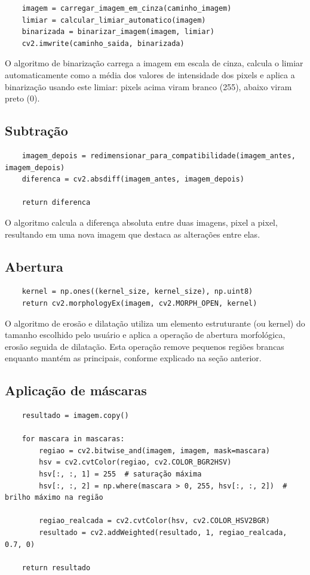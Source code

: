 \documentclass{article}
\begin{document}
\begin{verbatim}
    imagem = carregar_imagem_em_cinza(caminho_imagem)
    limiar = calcular_limiar_automatico(imagem)
    binarizada = binarizar_imagem(imagem, limiar)
    cv2.imwrite(caminho_saida, binarizada)
\end{verbatim}

O algoritmo de binarização carrega a imagem em escala de cinza, calcula o limiar automaticamente como a média dos valores de intensidade dos pixels e aplica a binarização usando este limiar: pixels acima viram branco (255), abaixo viram preto (0).

\subsection{Subtração}

\begin{verbatim}
    imagem_depois = redimensionar_para_compatibilidade(imagem_antes, imagem_depois)
    diferenca = cv2.absdiff(imagem_antes, imagem_depois)

    return diferenca
\end{verbatim}

O algoritmo calcula a diferença absoluta entre duas imagens, pixel a pixel, resultando em uma nova imagem que destaca as alterações entre elas.

\subsection{Abertura}

\begin{verbatim}
    kernel = np.ones((kernel_size, kernel_size), np.uint8)
    return cv2.morphologyEx(imagem, cv2.MORPH_OPEN, kernel)
\end{verbatim}

O algoritmo de erosão e dilatação utiliza um elemento estruturante (ou kernel) do tamanho escolhido pelo usuário e aplica a operação de abertura morfológica, erosão seguida de dilatação. Esta operação remove pequenos regiões brancas enquanto mantém as principais, conforme explicado na seção anterior.

\subsection{Aplicação de máscaras}

\begin{verbatim}
    resultado = imagem.copy()

    for mascara in mascaras:
        regiao = cv2.bitwise_and(imagem, imagem, mask=mascara)
        hsv = cv2.cvtColor(regiao, cv2.COLOR_BGR2HSV)
        hsv[:, :, 1] = 255  # saturação máxima
        hsv[:, :, 2] = np.where(mascara > 0, 255, hsv[:, :, 2])  # brilho máximo na região

        regiao_realcada = cv2.cvtColor(hsv, cv2.COLOR_HSV2BGR)
        resultado = cv2.addWeighted(resultado, 1, regiao_realcada, 0.7, 0)

    return resultado
\end{verbatim}
\end{document}
